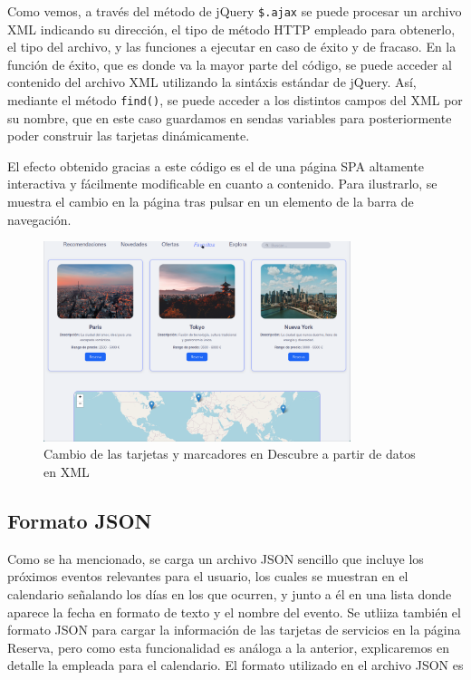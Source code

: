 \documentclass[11pt, a4paper]{book}
\begin{document}
    Como vemos, a través del método de jQuery \texttt{\$.ajax} se puede procesar un archivo XML indicando su dirección, el tipo de método HTTP empleado para obtenerlo, el tipo del archivo, y las funciones a ejecutar en caso de éxito y de fracaso. En la función de éxito, que es donde va la mayor parte del código, se puede acceder al contenido del archivo XML utilizando la sintáxis estándar de jQuery. Así, mediante el método \texttt{find()}, se puede acceder a los distintos campos del XML por su nombre, que en este caso guardamos en sendas variables para posteriormente poder construir las tarjetas dinámicamente. 

    El efecto obtenido gracias a este código es el de una página SPA altamente interactiva y fácilmente modificable en cuanto a contenido. Para ilustrarlo, se muestra el cambio en la página tras pulsar en un elemento de la barra de navegación.
    
	\begin{figure} [H]
		\centering
        \includegraphics[width=0.8\textwidth]{CSS/4 extra1.png}
		\caption{Cambio de las tarjetas y marcadores en Descubre a partir de datos en XML}
	\end{figure}

	\subsection{Formato JSON}
	Como se ha mencionado, se carga un archivo JSON sencillo que incluye los próximos eventos relevantes para el usuario, los cuales se muestran en el calendario señalando los días en los que ocurren, y junto a él en una lista donde aparece la fecha en formato de texto y el nombre del evento. Se utliiza también el formato JSON para cargar la información de las tarjetas de servicios en la página Reserva, pero como esta funcionalidad es análoga a la anterior, explicaremos en detalle la empleada para el calendario. El formato utilizado en el archivo JSON es
	
\end{document}
